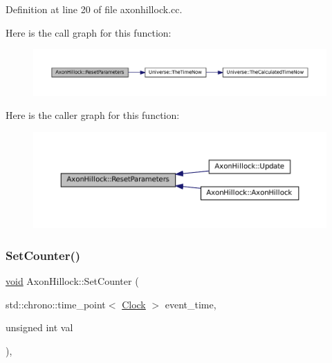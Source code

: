 Definition at line 20 of file axonhillock.\+cc.

Here is the call graph for this function\+:\nopagebreak
\begin{figure}[H]
\begin{center}
\leavevmode
\includegraphics[width=350pt]{class_axon_hillock_acec1571ef0b74f7f5ce6699c9b459b4f_cgraph}
\end{center}
\end{figure}
Here is the caller graph for this function\+:\nopagebreak
\begin{figure}[H]
\begin{center}
\leavevmode
\includegraphics[width=350pt]{class_axon_hillock_acec1571ef0b74f7f5ce6699c9b459b4f_icgraph}
\end{center}
\end{figure}
\mbox{\label{class_axon_hillock_a0220cee0ad99ddc48496982078c1856c}} 
\subsubsection{\texorpdfstring{Set\+Counter()}{SetCounter()}}
{\footnotesize\ttfamily \mbox{\hyperlink{glad_8h_a950fc91edb4504f62f1c577bf4727c29}{void}} Axon\+Hillock\+::\+Set\+Counter (\begin{DoxyParamCaption}\item[{std\+::chrono\+::time\+\_\+point$<$ \mbox{\hyperlink{universe_8h_a0ef8d951d1ca5ab3cfaf7ab4c7a6fd80}{Clock}} $>$}]{event\+\_\+time,  }\item[{unsigned int}]{val }\end{DoxyParamCaption})\hspace{0.3cm}{\ttfamily [inline]}, {\ttfamily [virtual]}}



